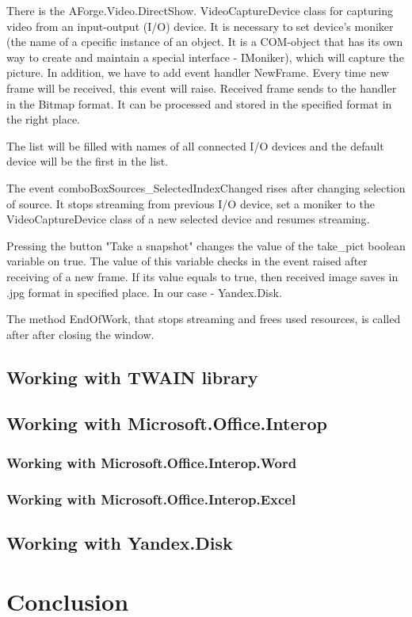 \documentclass[12pt,journal,compsoc]{D:/Магистратура/English/bare_conf/IEEEtran}
\begin{document}
There is the AForge.Video.DirectShow. VideoCaptureDevice class for capturing video from an input-output (I/O) device. It is necessary to set device's moniker (the name of a cpecific instance of an object. It is a COM-object that has its own way to create and maintain a special interface - IMoniker), which will capture the picture. In addition, we have to add event handler NewFrame. Every time new frame will be received, this event will raise. Received frame sends to the handler in the Bitmap format. It can be processed and stored in the specified format in the right place.

The list will be filled with names of all connected I/O devices and the default device will be the first in the list.

The event comboBoxSources\_SelectedIndexChanged rises after changing selection of source. It stops streaming from previous I/O device, set a moniker to the VideoCaptureDevice class of a new selected device and resumes streaming.

Pressing the button "Take a snapshot" changes the value of the take\_pict boolean variable on true. The value of this variable checks in the event raised after receiving of a new frame. If its value equals to true, then received image saves in .jpg format in specified place. In our case - Yandex.Disk.

The method EndOfWork, that stops streaming and frees used resources, is called after after closing the window.


\subsection{Working with TWAIN library}

\subsection{Working with Microsoft.Office.Interop}

\subsubsection{Working with Microsoft.Office.Interop.Word}

\subsubsection{Working with Microsoft.Office.Interop.Excel}

\subsection{Working with Yandex.Disk}

\section{Conclusion}
\end{document}
